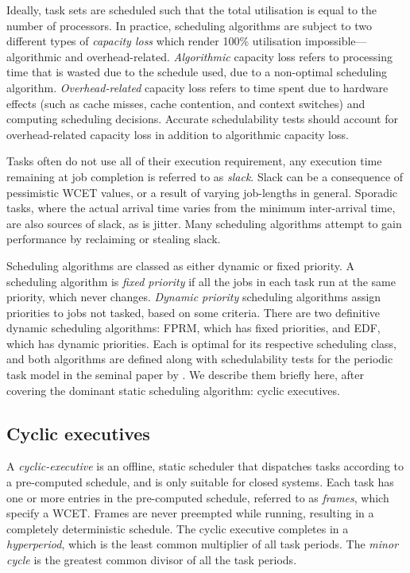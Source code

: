 Ideally, task sets are scheduled such that the total utilisation is equal to the number of
processors.  In practice, scheduling algorithms are subject to two different types of \emph{capacity
loss} which render 100\% utilisation impossible---algorithmic and overhead-related.
\emph{Algorithmic} capacity loss refers to processing time that is wasted due to the schedule used,
due to a non-optimal scheduling algorithm.  \emph{Overhead-related} capacity loss refers to time
spent due to hardware effects (such as cache misses, cache contention, and context switches) and
computing scheduling decisions.  Accurate schedulability tests should account for overhead-related
capacity loss in addition to algorithmic capacity loss.

Tasks often do not use all of their execution requirement, any execution time remaining at job
completion is referred to as \emph{slack}.
Slack can be a consequence of pessimistic \gls{WCET} values, or a result of varying job-lengths in
general. 
Sporadic tasks, where the actual arrival time varies from the minimum inter-arrival time, are also
sources of slack, as is jitter.
Many scheduling algorithms attempt to gain performance by reclaiming or stealing slack.

Scheduling algorithms are classed as either dynamic or fixed priority. A scheduling algorithm 
is \emph{fixed priority} if all the jobs in each task run at the same priority, which never changes. 
\emph{Dynamic priority} scheduling algorithms assign priorities to jobs not tasked, based on some criteria. 
There are two definitive dynamic scheduling  algorithms: \gls{FPRM}, which has fixed priorities, and
\gls{EDF}, which has dynamic priorities. Each is optimal for its respective scheduling class,  and both algorithms are defined along with
schedulability tests for the periodic task model in the seminal paper by \citet{Liu_Layland_73}. We
describe them briefly here, after covering the dominant static scheduling algorithm: cyclic
executives. 

\subsection{Cyclic executives}
\label{s:cyclic-executive}

A \emph{cyclic-executive} is an offline, static scheduler that dispatches tasks according to a pre-computed schedule, and is only
suitable for closed systems. Each task
has one or more entries in the pre-computed schedule, referred to as \emph{frames}, which specify a
\gls{WCET}. Frames are never preempted while running, resulting in a completely deterministic
schedule. The cyclic executive completes in a
\emph{hyperperiod}, which is the least common multiplier of all task periods. The \emph{minor cycle}
is the greatest common divisor of all the task periods.

